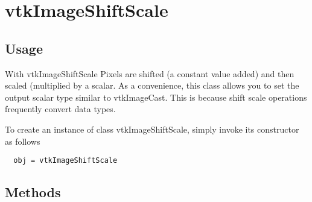 \section{vtkImageShiftScale}

\subsection{Usage}

 With vtkImageShiftScale Pixels are shifted (a constant value added)
 and then scaled (multiplied by a scalar. As a convenience, this class 
 allows you to set the output scalar type similar to vtkImageCast. 
 This is because shift scale operations frequently convert data types.

To create an instance of class vtkImageShiftScale, simply
invoke its constructor as follows
\begin{verbatim}
  obj = vtkImageShiftScale
\end{verbatim}
\subsection{Methods}

